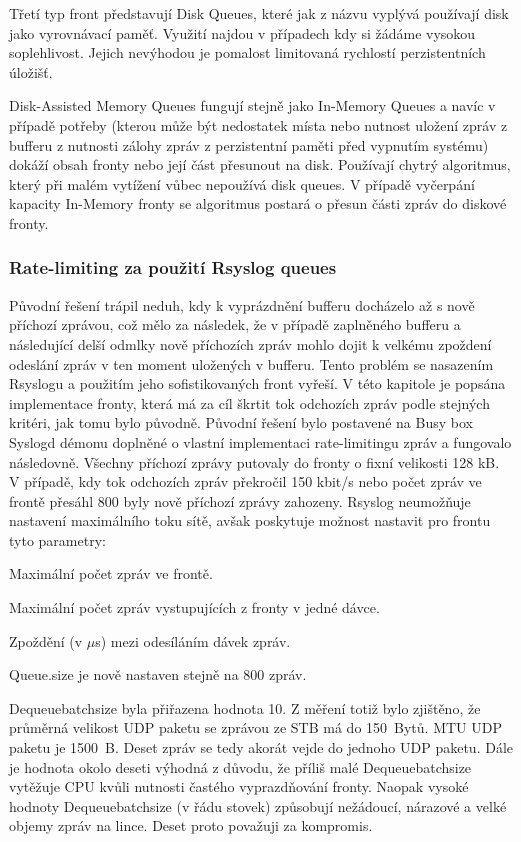 \documentclass[thesis=B,czech]{FITthesis}[2012/06/26]
\begin{document}
Třetí typ front představují Disk Queues, které jak z názvu vyplývá používají disk jako vyrovnávací paměť. Využití najdou v případech kdy si žádáme vysokou soplehlivost. Jejich nevýhodou je pomalost limitovaná rychlostí perzistentních úložišť.

Disk-Assisted Memory Queues fungují stejně jako In-Memory Queues a navíc v případě potřeby (kterou může být nedostatek místa nebo nutnost uložení zpráv z bufferu z nutnosti zálohy zpráv z perzistentní paměti před vypnutím systému) dokáží obsah fronty nebo její část přesunout na disk. Používají chytrý algoritmus, který při malém vytížení vůbec nepoužívá disk queues. V případě vyčerpání kapacity In-Memory fronty se algoritmus postará o přesun části zpráv do diskové fronty.

\subsubsection*{Rate-limiting za použití Rsyslog queues}
Původní řešení trápil neduh, kdy k vyprázdnění bufferu docházelo až s nově příchozí zprávou, což mělo za následek, že v případě zaplněného bufferu a následující delší odmlky nově příchozích zpráv mohlo dojit k velkému zpoždení odeslání zpráv v ten moment uložených v bufferu. Tento problém se nasazením Rsyslogu a použitím jeho sofistikovaných front vyřeší.
V této kapitole je popsána implementace fronty, která má za cíl škrtit tok odchozích zpráv podle stejných kritéri, jak tomu bylo původně.
Původní řešení bylo postavené na Busy box Syslogd démonu doplněné o vlastní implementaci rate-limitingu zpráv a fungovalo následovně. Všechny příchozí zprávy putovaly do fronty o fixní velikosti 128 kB. V případě, kdy tok odchozích zpráv překročil 150 kbit/s nebo počet zpráv ve frontě přesáhl 800 byly nově příchozí zprávy zahozeny.
Rsyslog neumožňuje nastavení maximálního toku sítě, avšak poskytuje možnost nastavit pro frontu tyto parametry:
\begin{description}
  \setlength\itemsep{-1ex}
  \item [queue.size:] Maximální počet zpráv ve frontě.
  \item [queue.dequeuebatchsize:] Maximální počet zpráv vystupujících z fronty v jedné dávce.
  \item [queue.dequeueslowdown:] Zpoždění (v $\mu$s) mezi odesíláním dávek zpráv.
\end{description}

Queue.size je nově nastaven stejně na 800 zpráv.

Dequeuebatchsize byla přiřazena hodnota 10. Z měření totiž bylo zjištěno, že průměrná velikost UDP paketu se zprávou ze STB má do 150~Bytů. MTU UDP paketu je 1500~B. Deset zpráv se tedy akorát vejde do jednoho UDP paketu.
Dále je hodnota okolo deseti výhodná z důvodu, že příliš malé Dequeuebatchsize vytěžuje CPU kvůli nutnosti častého vyprazdňování fronty. Naopak vysoké hodnoty  Dequeuebatchsize  (v řádu stovek) způsobují nežádoucí, nárazové a velké objemy zpráv na lince. Deset proto považuji za kompromis.
  
\end{document}
